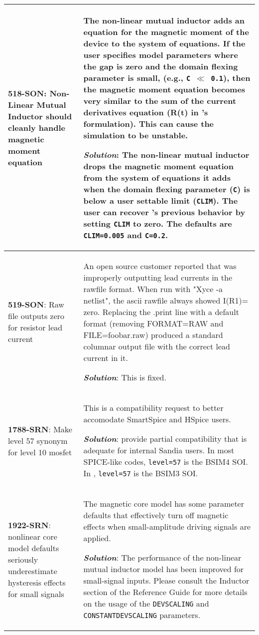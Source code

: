 \begin{longtable}[h] {>{\raggedright\small}m{2in}|>{\raggedright\let\\\tabularnewline\small}m{3.5in}}
\textbf{518-SON}: Non-Linear Mutual Inductor should cleanly handle
magnetic moment equation & The non-linear mutual inductor adds an equation
for the magnetic moment of the device to the system of equations.  If the user
specifies model parameters where the gap is zero and the domain flexing
parameter is small, (e.g., \texttt{C $\ll$ 0.1}), then the magnetic moment
equation becomes very similar to the sum of the current derivatives equation
(R(t) in \Xyce{}'s formulation).  This can cause the simulation to be unstable.

\textbf{\textit{Solution}}:  The non-linear mutual inductor drops the magnetic
moment equation from the system of equations it adds when the domain flexing
parameter (\texttt{C}) is below a user settable limit (\texttt{CLIM}). The
user can recover \Xyce{}'s previous behavior by setting \texttt{CLIM} to zero.
The defaults are \texttt{CLIM=0.005} and \texttt{C=0.2}.
\\ \hline

\textbf{519-SON}: Raw file outputs zero for resistor lead current & An open
source customer reported that \Xyce{} was improperly outputting lead currents in the rawfile
format.  When run with "Xyce -a netlist", the ascii rawfile always showed I(R1)= zero.
Replacing the .print line with a default format (removing FORMAT=RAW and
FILE=foobar.raw) produced a standard columnar output file with the correct lead
current in it.

\textbf{\textit{Solution}}: This is fixed.
\\ \hline

\textbf{1788-SRN}: Make level 57 synonym for level 10 mosfet & This is a
compatibility request to better accomodate SmartSpice and HSpice users. 

\textbf{\textit{Solution}}:  \Xyce{} provide partial compatibility that is
adequate for internal Sandia users.  In most SPICE-like codes, 
\texttt{level=57} is the BSIM4 SOI.  In \Xyce{}, \texttt{level=57} is the
BSIM3 SOI. 
\\ \hline

\textbf{1922-SRN}: \Xyce{} nonlinear core model defaults seriously underestimate
hysteresis effects for small signals & The magnetic core model has some
parameter defaults that effectively turn off magnetic effects when
small-amplitude driving signals are applied.  

\textbf{\textit{Solution}}: The performance of the \Xyce{} non-linear 
mutual inductor model has been improved for small-signal inputs.  Please
consult the Inductor section of the \Xyce{} Reference Guide for more
details on the usage of the \texttt{DEVSCALING} and 
\texttt{CONSTANTDEVSCALING} parameters.
\\ \hline

\end{longtable}

